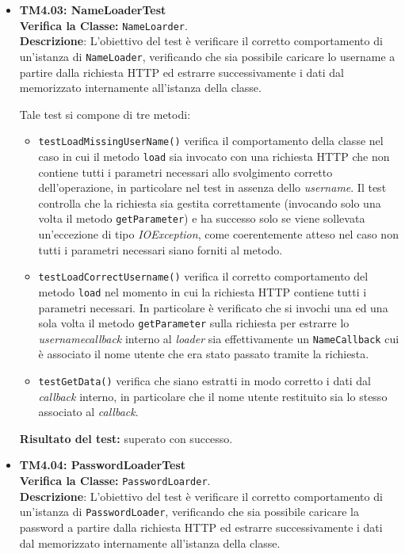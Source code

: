 \begin{itemize}
\item \textbf{TM4.03: NameLoaderTest}\\
\textbf{Verifica la Classe:} \texttt{NameLoarder}.\\
\textbf{Descrizione}: L'obiettivo del test è verificare il corretto comportamento di un'istanza di \texttt{NameLoader}, verificando che sia possibile caricare lo username a partire dalla richiesta HTTP ed estrarre successivamente i dati dal  memorizzato internamente all'istanza della classe.

Tale test si compone di tre metodi:
\begin{itemize}

\item \texttt{testLoadMissingUserName()} verifica il comportamento della classe nel caso in cui il metodo \texttt{load} sia invocato con una richiesta HTTP che non contiene tutti i parametri necessari allo svolgimento corretto dell'operazione, in particolare nel test in assenza dello \textit{username}. Il test controlla che la richiesta sia gestita correttamente (invocando solo una volta il metodo \texttt{getParameter}) e ha successo solo se viene sollevata un'eccezione di tipo \textit{IOException}, come coerentemente atteso nel caso non tutti i parametri necessari siano forniti al metodo.

\item \texttt{testLoadCorrectUsername()} verifica il corretto comportamento del metodo \texttt{load} nel momento in cui la richiesta HTTP contiene tutti i parametri necessari. In particolare è verificato che si invochi una ed una sola volta il metodo \texttt{getParameter} sulla richiesta per estrarre lo \textit{username}\textit{callback} interno al \textit{loader} sia effettivamente un \texttt{NameCallback} cui è associato il nome utente che era stato passato tramite la richiesta.

\item \texttt{testGetData()} verifica che siano estratti in modo corretto i dati dal \textit{callback} interno, in particolare che il nome utente restituito sia lo stesso associato al \textit{callback}.

\end{itemize}
\textbf{Risultato del test:} superato con successo.

\item \textbf{TM4.04: PasswordLoaderTest}\\
\textbf{Verifica la Classe:} \texttt{PasswordLoarder}.\\
\textbf{Descrizione}: L'obiettivo del test è verificare il corretto comportamento di un'istanza di \texttt{PasswordLoader}, verificando che sia possibile caricare la password a partire dalla richiesta HTTP ed estrarre successivamente i dati dal  memorizzato internamente all'istanza della classe.


\end{itemize}
